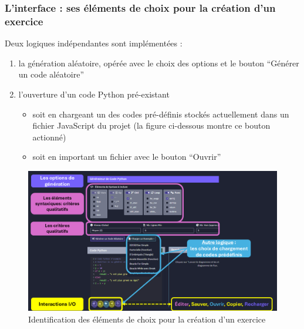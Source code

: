 \documentclass[11pt,a4paper]{article}
\begin{document}
\clearpage
\subsubsection{L'interface : ses éléments de choix pour la création d'un exercice}
\begin{minipage}{\textwidth}
Deux logiques indépendantes sont implémentées : 
\begin{enumerate}
    \item la génération aléatoire, opérée avec le choix des options et le bouton ``Générer un code aléatoire''
    \item l'ouverture d'un code Python pré-existant \begin{itemize}
        \item soit en chargeant un des codes pré-définis stockés actuellement dans un fichier JavaScript du projet (la figure ci-dessous montre ce bouton actionné)
        \item soit en important un fichier avec le bouton ``Ouvrir''
    \end{itemize}
\end{enumerate}

\begin{figure}[H]
    \centering
    \includegraphics[width=\textwidth, keepaspectratio]{app_choix_def.png}
    \caption{Identification des éléments de choix pour la création d'un exercice}
    \label{app_choix_def}
\end{figure} 

\end{minipage}
\end{document}
